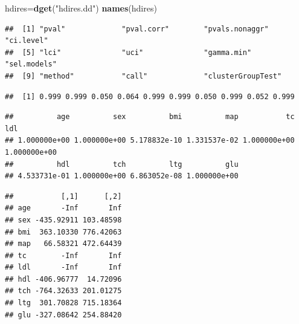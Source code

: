 \documentclass[
  ignorenonframetext,
]{beamer}
\newenvironment{Shaded}{\begin{snugshade}}{\end{snugshade}}
\newcommand{\CommentTok}[1]{\textcolor[rgb]{0.56,0.35,0.01}{\textit{#1}}}
\newcommand{\KeywordTok}[1]{\textcolor[rgb]{0.13,0.29,0.53}{\textbf{#1}}}
\newcommand{\NormalTok}[1]{#1}
\newcommand{\OperatorTok}[1]{\textcolor[rgb]{0.81,0.36,0.00}{\textbf{#1}}}
\newcommand{\StringTok}[1]{\textcolor[rgb]{0.31,0.60,0.02}{#1}}
\begin{document}
\begin{frame}[fragile]

\begin{Shaded}
\begin{Highlighting}[]
\NormalTok{hdires=}\KeywordTok{dget}\NormalTok{(}\StringTok{"hdires.dd"}\NormalTok{)}
\KeywordTok{names}\NormalTok{(hdires)}
\end{Highlighting}
\end{Shaded}

\begin{verbatim}
##  [1] "pval"             "pval.corr"        "pvals.nonaggr"    "ci.level"        
##  [5] "lci"              "uci"              "gamma.min"        "sel.models"      
##  [9] "method"           "call"             "clusterGroupTest"
\end{verbatim}

\begin{Shaded}
\end{Shaded}

\begin{verbatim}
##  [1] 0.999 0.999 0.050 0.064 0.999 0.999 0.050 0.999 0.052 0.999
\end{verbatim}

\begin{Shaded}
\end{Shaded}

\begin{verbatim}
##          age          sex          bmi          map           tc          ldl 
## 1.000000e+00 1.000000e+00 5.178832e-10 1.331537e-02 1.000000e+00 1.000000e+00 
##          hdl          tch          ltg          glu 
## 4.533731e-01 1.000000e+00 6.863052e-08 1.000000e+00
\end{verbatim}

\begin{Shaded}
\end{Shaded}

\begin{verbatim}
##           [,1]      [,2]
## age       -Inf       Inf
## sex -435.92911 103.48598
## bmi  363.10330 776.42063
## map   66.58321 472.64439
## tc        -Inf       Inf
## ldl       -Inf       Inf
## hdl -406.96777  14.72096
## tch -764.32633 201.01275
## ltg  301.70828 715.18364
## glu -327.08642 254.88420
\end{verbatim}

\normalsize

\end{frame}
\end{document}
